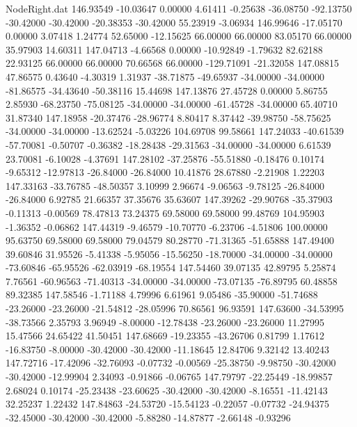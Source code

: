\begin{filecontents}{NodeRight.dat}
 146.93549  -10.03647    0.00000     4.61411   -0.25638  -36.08750  -92.13750  -30.42000  -30.42000  -20.38353  -30.42000   55.23919   -3.06934
 146.99646  -17.05170    0.00000     3.07418    1.24774   52.65000  -12.15625   66.00000   66.00000   83.05170   66.00000   35.97903   14.60311
 147.04713   -4.66568    0.00000   -10.92849   -1.79632   82.62188   22.93125   66.00000   66.00000   70.66568   66.00000 -129.71091  -21.32058
 147.08815   47.86575    0.43640    -4.30319    1.31937  -38.71875  -49.65937  -34.00000  -34.00000  -81.86575  -34.43640  -50.38116   15.44698
 147.13876   27.45728    0.00000     5.86755    2.85930  -68.23750  -75.08125  -34.00000  -34.00000  -61.45728  -34.00000   65.40710   31.87340
 147.18958  -20.37476  -28.96774     8.80417    8.37442  -39.98750  -58.75625  -34.00000  -34.00000  -13.62524   -5.03226  104.69708   99.58661
 147.24033  -40.61539  -57.70081    -0.50707   -0.36382  -18.28438  -29.31563  -34.00000  -34.00000    6.61539   23.70081   -6.10028   -4.37691
 147.28102  -37.25876  -55.51880    -0.18476    0.10174   -9.65312  -12.97813  -26.84000  -26.84000   10.41876   28.67880   -2.21908    1.22203
 147.33163  -33.76785  -48.50357     3.10999    2.96674   -9.06563   -9.78125  -26.84000  -26.84000    6.92785   21.66357   37.35676   35.63607
 147.39262  -29.90768  -35.37903    -0.11313   -0.00569   78.47813   73.24375   69.58000   69.58000   99.48769  104.95903   -1.36352   -0.06862
 147.44319   -9.46579  -10.70770    -6.23706   -4.51806  100.00000   95.63750   69.58000   69.58000   79.04579   80.28770  -71.31365  -51.65888
 147.49400   39.60846   31.95526    -5.41338   -5.95056  -15.56250  -18.70000  -34.00000  -34.00000  -73.60846  -65.95526  -62.03919  -68.19554
 147.54460   39.07135   42.89795     5.25874    7.76561  -60.96563  -71.40313  -34.00000  -34.00000  -73.07135  -76.89795   60.48858   89.32385
 147.58546   -1.71188    4.79996     6.61961    9.05486  -35.90000  -51.74688  -23.26000  -23.26000  -21.54812  -28.05996   70.86561   96.93591
 147.63600  -34.53995  -38.73566     2.35793    3.96949   -8.00000  -12.78438  -23.26000  -23.26000   11.27995   15.47566   24.65422   41.50451
 147.68669  -19.23355  -43.26706     0.81799    1.17612  -16.83750   -8.00000  -30.42000  -30.42000  -11.18645   12.84706    9.32142   13.40243
 147.72716  -17.42096  -32.76093    -0.07732   -0.00569  -25.38750   -9.98750  -30.42000  -30.42000  -12.99904    2.34093   -0.91866   -0.06765
 147.79797  -22.25449  -18.99857     2.68024    0.10174  -25.23438  -23.60625  -30.42000  -30.42000   -8.16551  -11.42143   32.25237    1.22432
 147.84863  -24.53720  -15.54123    -0.22057   -0.07732  -24.94375  -32.45000  -30.42000  -30.42000   -5.88280  -14.87877   -2.66148   -0.93296

\end{filecontents}
